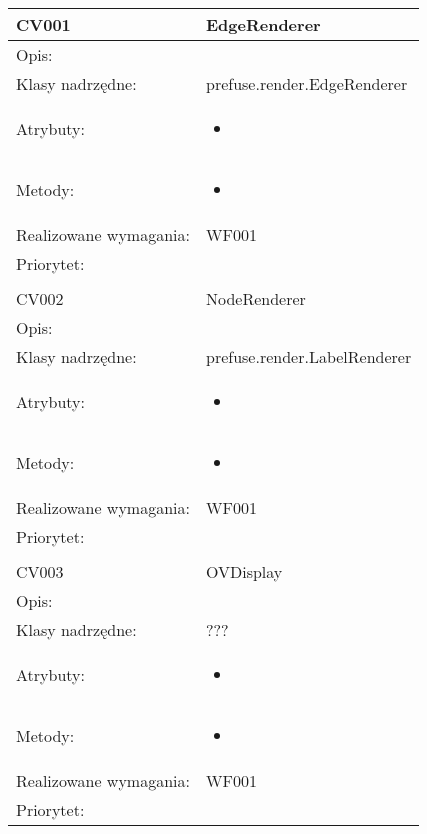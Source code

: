 \documentclass[a4paper,10pt]{article}
\begin{document}
\begin{center}
 

\begin{longtable}{|m{3cm}|m{9cm}|} \hline

CV001 & EdgeRenderer \\ \hline
Opis: &     \\ \hline
Klasy nadrzędne: &  prefuse.render.EdgeRenderer   \\ \hline
Atrybuty: & \begin{itemize}
 \item 
\end{itemize}
 \\ \hline
Metody: & \begin{itemize}
 \item 
\end{itemize}
  \\ \hline
Realizowane wymagania: & WF001 \\ \hline
Priorytet: &  \\ \hline

\multicolumn{2}{c}{} \\
 \hline

CV002 & NodeRenderer \\ \hline
Opis: &     \\ \hline
Klasy nadrzędne: &  prefuse.render.LabelRenderer   \\ \hline
Atrybuty: & \begin{itemize}
 \item 
\end{itemize}
 \\ \hline
Metody: & \begin{itemize}
 \item 
\end{itemize}
  \\ \hline
Realizowane wymagania: & WF001 \\ \hline
Priorytet: &  \\ \hline

\multicolumn{2}{c}{} \\
 \hline

CV003 & OVDisplay \\ \hline
Opis: &     \\ \hline
Klasy nadrzędne: &  ???   \\ \hline
Atrybuty: & \begin{itemize}
 \item 
\end{itemize}
 \\ \hline
Metody: & \begin{itemize}
 \item 
\end{itemize}
  \\ \hline
Realizowane wymagania: & WF001 \\ \hline
Priorytet: &  \\ \hline


\end{longtable}
\end{center}
\end{document}
